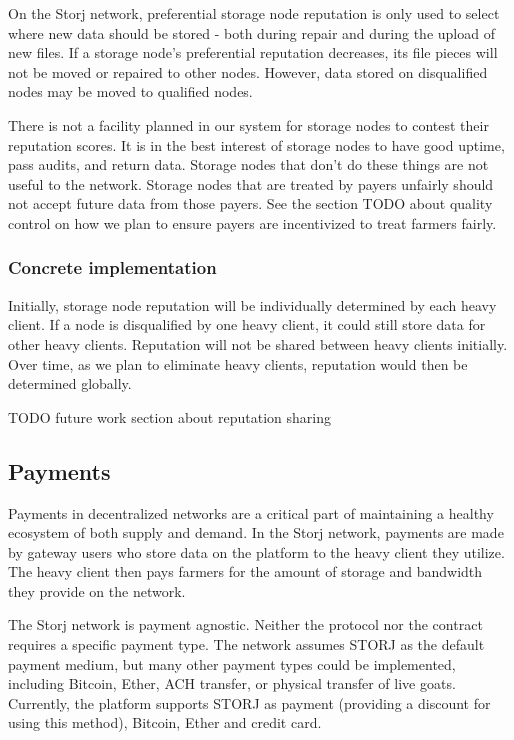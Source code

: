 \documentclass[a4paper,10pt]{article} \usepackage[utf8]{inputenc}
\newcommand{\todo}[1]{{\color{red} TODO #1 }}
\begin{document}
On the Storj network, preferential storage node reputation is only used to
select where new data should be stored - both during repair and during the
upload of new files.
If a storage node's preferential reputation decreases, its file pieces will not
be moved or repaired to other nodes.
However, data stored on disqualified nodes may be moved to qualified nodes.

There is not a facility planned in our system for storage nodes to contest their
reputation scores. It is in the best interest of storage nodes to have good
uptime, pass audits, and return data. Storage nodes that don't do these things
are not useful to the network. Storage nodes that are treated by payers unfairly
should not accept future data from those payers. See the section \todo{} about
quality control on how we plan to ensure payers are incentivized to treat
farmers fairly.

\subsubsection{Concrete implementation}

Initially, storage node reputation will be individually determined by each
heavy client. If a node is disqualified by one heavy client, it could still
store data for other heavy clients. Reputation will not be shared between
heavy clients initially. Over time, as we plan to eliminate heavy clients,
reputation would then be determined globally.

\todo{future work section about reputation sharing}

\subsection{Payments}

Payments in decentralized networks are a critical part of maintaining a healthy
ecosystem of both supply and demand.
In the Storj network, payments are made by gateway users who store data on the
platform to the heavy client they utilize.
The heavy client then pays farmers for the amount of storage and bandwidth they
provide on the network.

The Storj network is payment agnostic.
Neither the protocol nor the contract requires a specific payment type.
The network assumes STORJ as the default payment medium, but many other payment
types could be implemented, including Bitcoin, Ether, ACH transfer, or physical
transfer of live goats.
Currently, the platform supports STORJ as payment (providing a discount for
using this method), Bitcoin, Ether and credit card.
\end{document}
